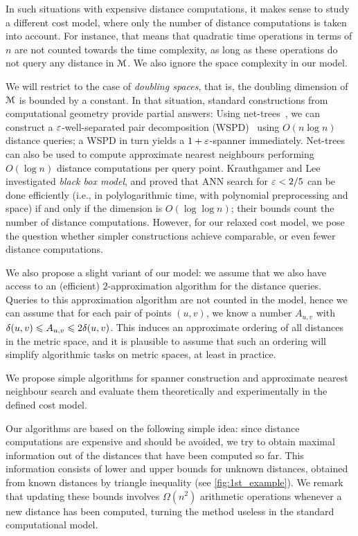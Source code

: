 In such situations with expensive distance computations, 
it makes sense to study a different cost model, where only the number of distance computations
is taken into account. For instance, that means that quadratic time operations in terms of $n$
are not counted towards the time complexity, as long as these operations do not query any distance
in $\mathcal{M}$. We also ignore the space complexity in our model.

We will restrict to the case of \emph{doubling spaces}, that is, the doubling dimension
of $\mathcal{M}$ is bounded by a constant. 
In that situation, standard constructions from computational geometry provide partial answers:
Using net-trees~\cite{hm-fast}, we can construct a $\varepsilon$-well-separated pair decomposition (WSPD)~\cite{CK-decomposition} using $O(n\log n)$ distance queries; a WSPD in turn yields
a {$1+\varepsilon$-spanner} immediately. Net-trees can also be used to compute approximate nearest neighbours
performing $O(\log n)$ distance computations per query point.
Krauthgamer and Lee \cite{krauthgamer2005black} investigated \textit{black box model},
and proved that ANN search for $\varepsilon < 2/5$ can be done efficiently (i.e., in polylogarithmic time, with polynomial preprocessing
and space) if and only if the dimension is $O(\log \log n)$; their bounds count the number of distance computations.
However, for our relaxed cost model, we pose the question whether simpler constructions achieve
comparable, or even fewer distance computations.

We also propose a slight variant of our model: we assume that we also have access to an (efficient)
$2$-approximation algorithm for the distance queries. Queries to this approximation algorithm
are not counted in the model, hence we can assume that for each pair of points $(u,v)$, we
know a number $A_{u,v}$ with $\delta(u,v)\leqslant A_{u,v}\leqslant 2\delta(u,v)$. This induces an approximate ordering
of all distances in the metric space, and it is plausible to assume that such an ordering will simplify
algorithmic tasks on metric spaces, at least in practice.

%
We propose simple algorithms for spanner construction and approximate nearest neighbour search
and evaluate them theoretically and experimentally in the defined cost model.

Our algorithms are based on the following simple idea: since distance computations are expensive
and should be avoided, we try to obtain maximal information out of the distances that have been computed
so far. 
This information consists of lower and upper bounds for unknown distances, obtained from known distances
by triangle inequality (see \cref{fig:1st_example}). We remark that updating these bounds involves $\Omega(n^2)$ arithmetic
operations whenever a new distance has been computed, turning the method useless in the standard computational model.

